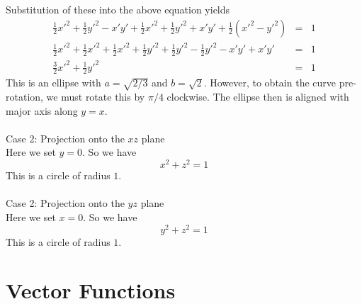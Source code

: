 \documentclass[12pt]{amsbook}
\begin{document}
Substitution of these into the above equation yields
\begin{eqnarray*}
\frac{1}{2}x'^2+\frac{1}{2}y'^2-x'y'+\frac{1}{2}x'^2+\frac{1}{2}y'^2+x'y'+\frac{1}{2}(x'^2-y'^2)&=&1\\
\frac{1}{2}x'^2+\frac{1}{2}x'^2+\frac{1}{2}x'^2+\frac{1}{2}y'^2+\frac{1}{2}y'^2-\frac{1}{2}y'^2-x'y'+x'y'&=&1\\
\frac{3}{2}x'^2+\frac{1}{2}y'^2&=&1
\end{eqnarray*}
This is an ellipse with $a=\sqrt{2/3}$ and $b=\sqrt{2}$. However, to obtain the curve pre-rotation, we must rotate this by $\pi/4$ clockwise. The ellipse then is aligned with major axis along $y=x$. 
\\
\\ 
Case 2: Projection onto the $xz$ plane
\\
Here we set $y=0$. So we have
$$x^2+z^2=1$$
This is a circle of radius $1$.
\\
\\ 
Case 2: Projection onto the $yz$ plane
\\
Here we set $x=0$. So we have
$$y^2+z^2=1$$
This is a circle of radius $1$.

\chapter{Vector Functions}
\end{document}
